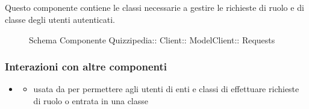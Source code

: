 \subsection{}
Questo componente contiene le classi necessarie a gestire le richieste di ruolo e di classe degli utenti autenticati.
\begin{figure}[H]
\centering
\noindent{}
\caption[Schema Componente Requests]{Schema Componente Quizzipedia:: Client:: ModelClient:: Requests}
\end{figure}
\subsubsection{Interazioni con altre componenti}
\begin{itemize}
\item {}
\begin{itemize}
\item usata da  per permettere agli utenti di enti e classi di effettuare richieste di ruolo o entrata in una classe
\end{itemize}
\end{itemize}
